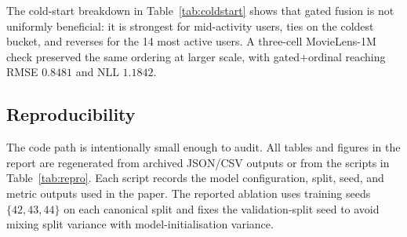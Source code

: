 \documentclass{article} %
\begin{document}
The cold-start breakdown in Table~\ref{tab:coldstart} shows that gated fusion
is not uniformly beneficial: it is strongest for mid-activity users, ties on
the coldest bucket, and reverses for the 14 most active users. A three-cell
MovieLens-1M check preserved the same ordering at larger scale, with
gated$+$ordinal reaching RMSE $0.8481$ and NLL $1.1842$.

\begin{table}[ht]
\centering
\caption{Scale-up to MovieLens-1M, random $80/10/10$ split, mean $\pm$ std over
three seeds.}
\label{tab:ml1m}
\end{table}

\subsection{Reproducibility}
The code path is intentionally small enough to audit. All tables and figures in
the report are regenerated from archived JSON/CSV outputs or from the scripts
in Table~\ref{tab:repro}. Each script records the model configuration, split,
seed, and metric outputs used in the paper. The reported ablation uses training
seeds $\{42,43,44\}$ on each canonical split and fixes the validation-split
seed to avoid mixing split variance with model-initialisation variance.

\begin{table}[ht]
\centering
\caption{Core reproduction scripts. Wall times are approximate on M1 Pro CPU.}
\label{tab:repro}
\end{table}
\end{document}
